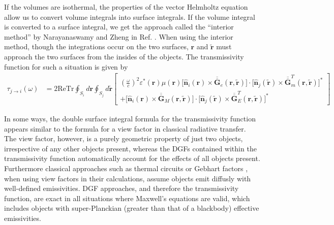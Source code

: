 If the volumes are isothermal, the properties of the vector Helmholtz equation allow us to convert volume integrals into surface integrals. If the volume integral is converted to a surface integral, we get the approach called the ``interior method'' by Narayanaswamy and Zheng in Ref. . When using the interior method, though the integrations occur on the two surfaces, $\boldsymbol{r}$ and $\widetilde{\boldsymbol{r}}$ must approach the two surfaces from the insides of the objects. The transmissivity function for such a situation is given by
%
\begin{align}
\tau_{j \rightarrow i} (\omega) &= 2 \mathrm{Re} \mathrm{Tr} \oint_{S_i} d\boldsymbol{r} \oint_{S_j} d\boldsymbol{\widetilde{r}}
\left[ \!\! \begin{array}{r} \! \! \left( \frac{\omega}{c} \right)^{2} \! \! \varepsilon^{*}(\boldsymbol{r}) \mu(\boldsymbol{r}) \bigg[ \boldsymbol{\widehat{n}}_{i}(\boldsymbol{r}) \times \overline{\overline{\boldsymbol{G}}}_{e}(\boldsymbol{r}, \widetilde{\boldsymbol{r}}) \bigg] \! \cdot \! \bigg[ \boldsymbol{\widehat{n}}_{j}(\boldsymbol{\widetilde{r}}) \times \overline{\overline{\boldsymbol{G}}}_{m}^{T}(\boldsymbol{r}, \boldsymbol{\widetilde{r}}) \bigg]^{*} \\
+ \bigg[ \boldsymbol{\widehat{n}}_{i}(\boldsymbol{r}) \times \overline{\overline{\boldsymbol{G}}}_{M}(\boldsymbol{r}, \boldsymbol{\widetilde{r}}) \bigg] \! \cdot \! \bigg[ \boldsymbol{\widehat{n}}_{j}(\boldsymbol{\widetilde{r}}) \times \overline{\overline{\boldsymbol{G}}}_{E}^{T}(\boldsymbol{r}, \boldsymbol{\widetilde{r}}) \bigg]^{*}
\end{array} \!\! \right] \label{eq:Transmissivity_Interior}
\end{align}

In some ways, the double surface integral formula for the transmissivity function appears similar to the formula for a view factor \cite{Howell2011} in classical radiative transfer. The view factor, however, is a purely geometric property of just two objects, irrespective of any other objects present, whereas the DGFs contained within the transmissivity function automatically account for the effects of all objects present. Furthermore classical approaches such as thermal circuits or Gebhart factors \cite{Gebhart1961}, when using view factors in their calculations, assume objects emit diffusly with well-defined emissivities. DGF approaches, and therefore the transmissivity function, are exact in all situations where Maxwell's equations are valid, which includes objects with super-Planckian (greater than that of a blackbody) effective emissivities.

